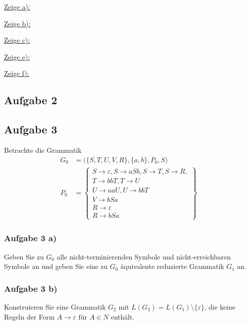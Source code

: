 \begin{lösung}
	\underline{Zeige a):}
	
	\underline{Zeige b):}
	
	
	\underline{Zeige c):}
	
	
	\underline{Zeige e):}
		
	\underline{Zeige f):}
	
\end{lösung}

\subsection{Aufgabe 2}

\begin{lösung}
	
\end{lösung} 

\subsection{Aufgabe 3}
Betrachte die Grammatik
\begin{align*}
	G_0&=\Big(\lbrace S,T,U,V,R\rbrace,\lbrace a,b\rbrace,P_0,S\Big)\\
	P_0&=\left\lbrace
		\begin{array}{c}
			 S\to\varepsilon,S\to aSb,S\to T,S\to R,\\
			 T\to bbT, T\to U\\
			 U\to aa U,U\to bbT\\
			 V\to bSa\\
			 R\to\varepsilon\\
			 R\to bSa
		\end{array}\right\rbrace		
\end{align*}
	
\subsubsection{Aufgabe 3 a)}
Geben Sie zu $G_0$ alle nicht-terminierenden Symbole und nicht-erreichbaren Symbole an und geben Sie eine zu $G_0$ äquivalente reduzierte Grammatik $G_1$ an.

\begin{lösung}
\end{lösung}

\subsubsection{Aufgabe 3 b)}
Konstruieren Sie eine Grammatik $G_2$ mit $L(G_2)=L(G_1)\setminus\lbrace\varepsilon\rbrace$, die keine Regeln der Form $A\to\varepsilon$ für $A\in N$ enthält.

